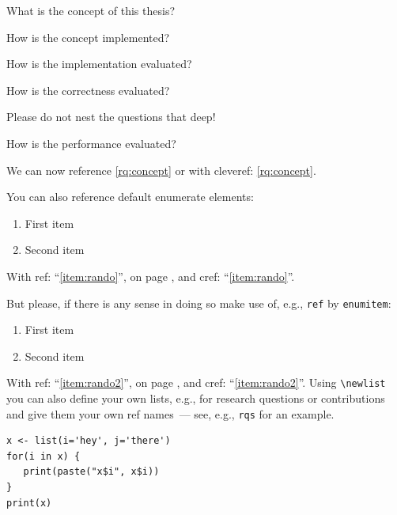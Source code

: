 \begin{rqs}
   \item \label{rq:concept} What is the concept of this thesis?
   \item \label{rq:implementation} How is the concept implemented?
   \item \label{rq:evaluation} How is the implementation evaluated?
   \begin{rqs}
      \item \label{rq:evaluation:correctness} How is the correctness evaluated? \begin{rqs}
         \item Please do not nest the questions that deep!
      \end{rqs}
      \item \label{rq:evaluation:performance} How is the performance evaluated?
   \end{rqs}
\end{rqs}

We can now reference \ref{rq:concept} or with cleveref: \cref{rq:concept}.

You can also reference default enumerate elements:

\begin{enumerate}
   \item \label{item:rando}First item
   \item Second item
\end{enumerate}

With ref: \enquote{\ref{item:rando}}, on page \pageref{item:rando}, and cref: \enquote{\cref{item:rando}}. 

But please, if there is any sense in doing so make use of, e.g., \texttt{ref} by \texttt{enumitem}:

\begin{enumerate}[ref={Penguin Element \arabic*}]
   \item \label{item:rando2}First item
   \item Second item
\end{enumerate}

With ref: \enquote{\ref{item:rando2}}, on page \pageref{item:rando2}, and cref: \enquote{\cref{item:rando2}}.
Using \texttt{\textbackslash newlist} you can also define your own lists, e.g., for research questions or contributions and give them your own ref names~--- see, e.g., \texttt{rqs} for an example.


\begin{verbatim}
x <- list(i='hey', j='there')
for(i in x) {
   print(paste("x$i", x$i))
}
print(x)
\end{verbatim}


